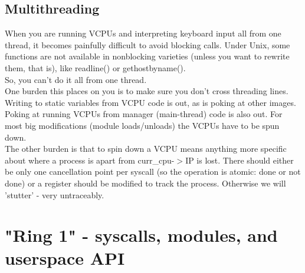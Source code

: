 \documentclass[a4paper,oneside,openany]{book}
\begin{document}
\subsection{Multithreading}
When you are running VCPUs and interpreting keyboard input all from one
thread, it becomes painfully difficult to avoid blocking calls. Under Unix,
some functions are not available in nonblocking varieties (unless you
want to rewrite them, that is), like readline() or gethostbyname().\smallskip\\
So, you can't do it all from one thread.\smallskip\\
One burden this places on you is to make sure you don't cross threading lines.
Writing to static variables from VCPU code is out, as is poking at other 
images. Poking at running VCPUs from manager (main-thread) code is also out.
For most big modifications (module loads/unloads) the VCPUs have to be spun
down.\smallskip\\
The other burden is that to spin down a VCPU means anything more specific about
where a process is apart from curr\_cpu-$>$IP is lost. There should either be
only one cancellation point per syscall (so the operation is atomic: done or
not done) or a register should be modified to track the process. Otherwise we
will 'stutter' - very untraceably.
\section{"Ring 1" - syscalls, modules, and userspace API}
\end{document}
